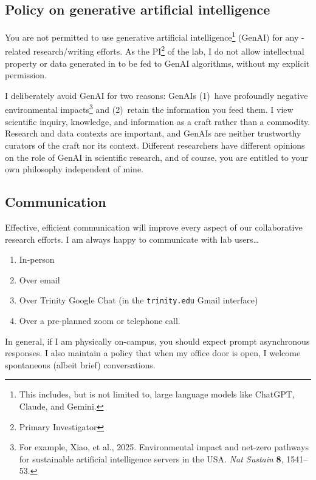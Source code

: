 \subsection{Policy on generative artificial intelligence}\label{s:ai}
You are not permitted to use generative artificial intelligence\footnote{This includes, but is not limited to, large language models like ChatGPT, Claude, and Gemini.} (GenAI) for any \grackle-related research/writing efforts. 
As the PI\footnote{Primary Investigator} of the lab, I do not allow intellectual property or data generated in \grackle{} to be fed to GenAI algorithms, without my explicit permission.

I deliberately avoid GenAI for two reasons: GenAIs (1)~have profoundly negative environmental impacts\footnote{For example, Xiao, et al., 2025. Environmental impact and net-zero pathways for sustainable artificial intelligence servers in the USA. \textit{Nat Sustain} \textbf{8}, 1541--53. } and (2)~retain the information you feed them. 
I view scientific inquiry, knowledge, and information as a craft rather than a commodity. 
Research and data contexts are important, and GenAIs are neither trustworthy curators of the craft nor its context.
Different researchers have different opinions on the role of GenAI in scientific research, and of course, you are entitled to your own philosophy independent of mine.


\subsection{Communication}\label{s:comm}
Effective, efficient communication will improve every aspect of our collaborative research efforts. 
I am always happy to communicate with lab users\ldots
\begin{enumerate}\setlength{\parskip}{0pt}\setlength{\itemsep}{0pt}
    \item In-person
    \item Over email
    \item Over Trinity Google Chat (in the \texttt{trinity.edu} Gmail interface)
    \item Over a pre-planned zoom or telephone call.
\end{enumerate}

In general, if I am physically on-campus, you should expect prompt asynchronous responses.
I also maintain a policy that when my office door is open, I welcome spontaneous (albeit brief) conversations.


